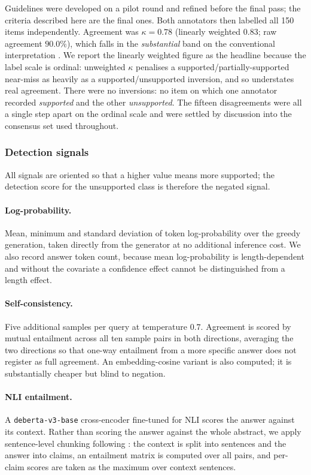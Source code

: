 \documentclass[11pt,a4paper]{article}
\begin{document}
Guidelines were developed on a pilot round and refined before the final pass;
the criteria described here are the final ones. Both annotators then labelled
all 150 items independently. Agreement was $\kappa = 0.78$ (linearly weighted
$0.83$; raw agreement $90.0\%$), which falls in the \emph{substantial} band on
the conventional interpretation \cite{landis1977measurement}. We report the
linearly weighted figure as the headline because the label scale is ordinal:
unweighted $\kappa$ penalises a supported/partially-supported near-miss as
heavily as a supported/unsupported inversion, and so understates real
agreement. There were no inversions: no item on which one annotator recorded
\emph{supported} and the other \emph{unsupported}. The fifteen disagreements
were all a single step apart on the ordinal scale and were settled by discussion
into the consensus set used throughout.

\subsubsection{Detection signals}

All signals are oriented so that a higher value means more supported; the
detection score for the unsupported class is therefore the negated signal.

\paragraph{Log-probability.}
Mean, minimum and standard deviation of token log-probability over the greedy
generation, taken directly from the generator at no additional inference cost.
We also record answer token count, because mean log-probability is
length-dependent and without the covariate a confidence effect cannot be
distinguished from a length effect.

\paragraph{Self-consistency.}
Five additional samples per query at temperature $0.7$. Agreement is scored by
mutual entailment across all ten sample pairs in both directions, averaging the
two directions so that one-way entailment from a more specific answer does not
register as full agreement. An embedding-cosine variant is also computed; it is
substantially cheaper but blind to negation.

\paragraph{NLI entailment.}
A \texttt{deberta-v3-base} cross-encoder \cite{he2021deberta} fine-tuned for NLI
scores the answer against its context. Rather than scoring the answer against
the whole abstract, we apply sentence-level chunking following
\cite{laban2022summac}: the context is split into sentences and the answer into
claims, an entailment matrix is computed over all pairs, and per-claim scores
are taken as the maximum over context sentences.
\end{document}
